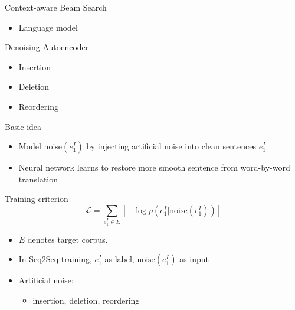\documentclass[11pt, a4paper, landscape]{article}
\begin{document}
	\NewPage
	\vfill
	Context-aware Beam Search
	\begin{itemize}
		\item Language model\\
	\end{itemize}
	Denoising Autoencoder
	\begin{itemize}
		\item Insertion
		\item Deletion
		\item Reordering
	\end{itemize}	
	\vfill
		
	
	\NewPage
	\vfill
	Basic idea
	\begin{itemize}
		\item Model ${\text{noise}}(e_1^I)$ by injecting artificial noise into clean sentences $e_1^I$
		\item Neural network learns to restore more smooth sentence from word-by-word translation\\
	\end{itemize}
	 Training criterion
	\[ \mathcal{L} = \sum_{e_1^I \in E}[-\log p(e_1^I|\text{noise}(e_1^I))]\]
	\begin{itemize}
		\item $E$ denotes target corpus.
		\item In Seq2Seq training, $e_1^I$ as label, $\text{noise}(e_1^I)$  as input 
		\item Artificial noise:
		\begin{itemize}
			\item insertion, deletion, reordering
		\end{itemize} 
	\end{itemize}


\vfill
\end{document}
